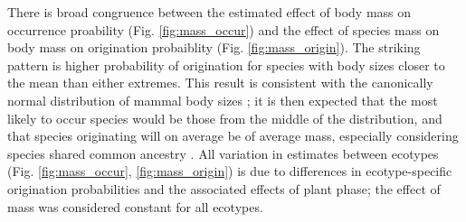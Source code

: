 
There is broad congruence between the estimated effect of body mass on occurrence proability (Fig. \ref{fig:mass_occur}) and the effect of species mass on body mass on origination probaiblity (Fig. \ref{fig:mass_origin}). The striking pattern is higher probability of origination for species with body sizes closer to the mean than either extremes. This result is consistent with the canonically normal distribution of mammal body sizes \citep{Smith2004}; it is then expected that the most likely to occur species would be those from the middle of the distribution, and that species originating will on average be of average mass, especially considering species shared common ancestry \citep{Felsenstein1985b}. All variation in estimates between ecotypes (Fig. \ref{fig:mass_occur}, \ref{fig:mass_origin}) is due to differences in ecotype-specific origination probabilities and the associated effects of plant phase; the effect of mass was considered constant for all ecotypes.

